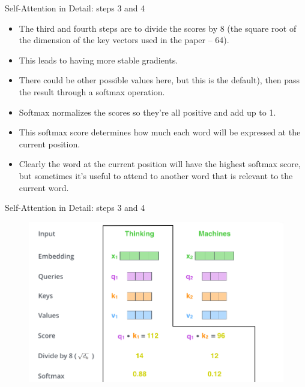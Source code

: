 \documentclass[handout]{beamer}
\begin{document}
\begin{frame}{Self-Attention in Detail: steps 3 and 4}
\begin{scriptsize}
\begin{itemize}


\item The third and fourth steps are to divide the scores by 8 (the square root of the dimension of the key vectors used in the paper – 64).

\item This leads to having more stable gradients. 

\item There could be other possible values here, but this is the default), then pass the result through a softmax operation. 

\item Softmax normalizes the scores so they’re all positive and add up to 1.

\item This softmax score determines how much each word will be expressed at the current position. 

\item Clearly the word at the current position will have the highest softmax score, but sometimes it’s useful to attend to another word that is relevant to the current word.

\end{itemize}

\end{scriptsize}


\end{frame}




\begin{frame}{Self-Attention in Detail: steps 3 and 4}


\begin{figure}[h]
        	\includegraphics[scale = 0.35]{pics/self-attention_softmax.png}
        \end{figure} 


\end{frame}
\end{document}
